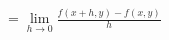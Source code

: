 \documentclass[preview]{standalone}
\begin{document}
\begin{align*}
= \lim_{h \to 0} \frac{f(x + h, y) - f(x, y)}{h}
\end{align*}
\end{document}
